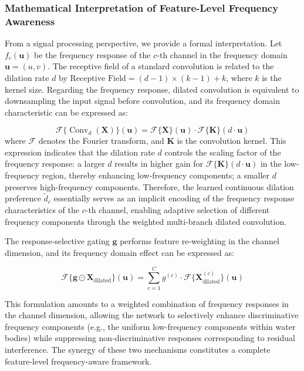 \documentclass[lettersize,journal]{IEEEtran}
\begin{document}
\subsubsection{Mathematical Interpretation of Feature-Level Frequency Awareness}

From a signal processing perspective, we provide a formal interpretation. Let $f_c(\mathbf{u})$ be the frequency response of the $c$-th channel in the frequency domain $\mathbf{u} = (u,v)$. The receptive field of a standard convolution is related to the dilation rate $d$ by $\text{Receptive Field} = (d-1) \times (k-1) + k$, where $k$ is the kernel size. Regarding the frequency response, dilated convolution is equivalent to downsampling the input signal before convolution, and its frequency domain characteristic can be expressed as:

\begin{equation}
\mathcal{F}\{\operatorname{Conv}_d(\mathbf{X})\}(\mathbf{u}) = \mathcal{F}\{\mathbf{X}\}(\mathbf{u}) \cdot \mathcal{F}\{\mathbf{K}\}(d \cdot \mathbf{u})
\end{equation}
where $\mathcal{F}$ denotes the Fourier transform, and $\mathbf{K}$ is the convolution kernel. This expression indicates that the dilation rate $d$ controls the scaling factor of the frequency response: a larger $d$ results in higher gain for $\mathcal{F}\{\mathbf{K}\}(d \cdot \mathbf{u})$ in the low-frequency region, thereby enhancing low-frequency components; a smaller $d$ preserves high-frequency components. Therefore, the learned continuous dilation preference $\tilde{d}_c$ essentially serves as an implicit encoding of the frequency response characteristics of the $c$-th channel, enabling adaptive selection of different frequency components through the weighted multi-branch dilated convolution.

The response-selective gating $\mathbf{g}$ performs feature re-weighting in the channel dimension, and its frequency domain effect can be expressed as:

\begin{equation}
\mathcal{F}\{\mathbf{g} \odot \mathbf{X}_{\text{dilated}}\}(\mathbf{u}) = \sum_{c=1}^{C} g^{(c)} \cdot \mathcal{F}\{\mathbf{X}_{\text{dilated}}^{(c)}\}(\mathbf{u})
\end{equation}

This formulation amounts to a weighted combination of frequency responses in the channel dimension, allowing the network to selectively enhance discriminative frequency components (e.g., the uniform low-frequency components within water bodies) while suppressing non-discriminative responses corresponding to residual interference. The synergy of these two mechanisms constitutes a complete feature-level frequency-aware framework.
\end{document}
